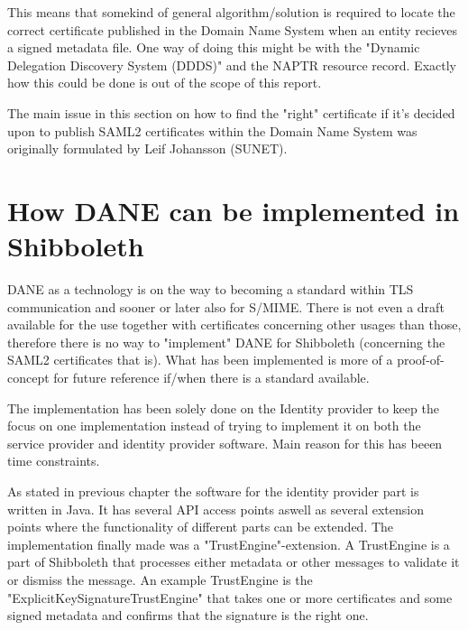 This means that somekind of general algorithm/solution is required to locate the correct certificate published in the Domain Name System when an entity recieves a signed metadata file.
One way of doing this might be with the "Dynamic Delegation Discovery System (DDDS)"\cite{rfc:3401,rfc:3402,rfc:3403,rfc:3404} and the NAPTR resource record\cite{rfc:3403}.
Exactly how this could be done is out of the scope of this report.

The main issue in this section on how to find the "right" certificate if it's decided upon to publish SAML2 certificates within the Domain Name System was originally formulated by Leif Johansson (SUNET).

\section{How DANE can be implemented in Shibboleth} 
DANE as a technology is on the way to becoming a standard within TLS communication and sooner or later also for S/MIME.
There is not even a draft available for the use together with certificates concerning other usages than those, therefore there is no way to "implement" DANE for Shibboleth (concerning the SAML2 certificates that is).
What has been implemented is more of a proof-of-concept for future reference if/when there is a standard available.

The implementation has been solely done on the Identity provider to keep the focus on one implementation instead of trying to implement it on both the service provider and identity provider software.
Main reason for this has beeen time constraints.

As stated in previous chapter the software for the identity provider part is written in Java.
It has several API access points aswell as several extension points where the functionality of different parts can be extended.
The implementation finally made was a "TrustEngine"-extension.
A TrustEngine is a part of Shibboleth that processes either metadata or other messages to validate it or dismiss the message.
An example TrustEngine is the "ExplicitKeySignatureTrustEngine" that takes one or more certificates and some signed metadata and confirms that the signature is the right one. 



